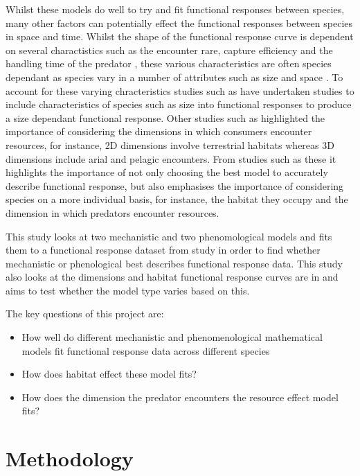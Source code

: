 \documentclass[11pt]{article}
\begin{document}
Whilst these models do well to try and fit functional responses between species, many other factors can potentially effect the functional responses between species in space and time. Whilst the shape of the functional response curve is dependent on several charactistics such as the encounter rare, capture efficiency and the handling time of the predator \cite{Holling1965}, these various characteristics are often species dependant as species vary in a number of attributes such as size and space \cite{Elliott2003}. To account for these varying chracteristics studies such as \cite{Aljetlawi2004}  have undertaken studies to include characteristics of species such as size into functional responses to produce a size dependant functional response. Other studies such as \cite{Pawar2012} highlighted the importance of considering the dimensions in which consumers encounter resources, for instance, 2D dimensions involve terrestrial habitats whereas 3D dimensions include arial and pelagic encounters. From studies such as these it highlights the importance of not only choosing the best model to accurately describe functional response, but also emphasises the importance of considering species on a more individual basis, for instance, the habitat they occupy and the dimension in which predators encounter resources. 

This study looks at two mechanistic and two phenomological models and fits them to a functional response dataset from \cite{Pawar2012} study in order to find whether mechanistic or phenological best describes functional response data. This study also looks at the dimensions and habitat functional response curves are in and aims to test whether the model type varies based on this.

The key questions of this project are:
	\begin{itemize}
	\item How well do different mechanistic and phenomenological mathematical models fit functional response data across different species
	\item How does habitat effect these model fits? 
	\item How does the dimension the predator encounters the resource effect model fits? 
	\end{itemize}
\newpage

	\section{Methodology}
\noindent
\end{document}
